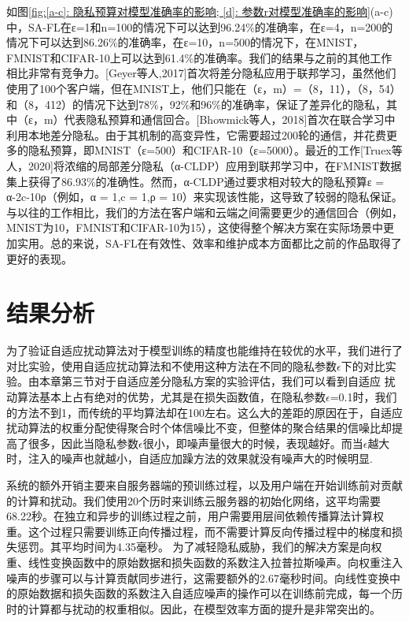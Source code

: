 如图\ref{fig:[a-c]: 隐私预算对模型准确率的影响; [d]: 参数r对模型准确率的影响}(a-c)中，SA-FL在ε=1和n=100的情况下可以达到96.24$\%$的准确率，在ε=4，n=200的情况下可以达到86.26$\%$的准确率，在ε=10，n=500的情况下，在MNIST，FMNIST和CIFAR-10上可以达到61.4$\%$的准确率。我们的结果与之前的其他工作相比非常有竞争力。[Geyer等人,2017]首次将差分隐私应用于联邦学习，虽然他们使用了100个客户端，但在MNIST上，他们只能在（ε，m）=（8，11），（8，54）和（8，412）的情况下达到78$\%$，92$\%$和96$\%$的准确率，保证了差异化的隐私，其中（ε，m）代表隐私预算和通信回合。[Bhowmick等人，2018]首次在联合学习中利用本地差分隐私。由于其机制的高变异性，它需要超过200轮的通信，并花费更多的隐私预算，即MNIST（ε=500）和CIFAR-10（ε=5000）。最近的工作[Truex等人，2020]将浓缩的局部差分隐私（α-CLDP）应用到联邦学习中，在FMNIST数据集上获得了86.93$\%$的准确性。然而，α-CLDP通过要求相对较大的隐私预算ε = α-2c-10ρ（例如，α = 1,c = 1,ρ = 10）来实现该性能，这导致了较弱的隐私保证。与以往的工作相比，我们的方法在客户端和云端之间需要更少的通信回合（例如，MNIST为10，FMNIST和CIFAR-10为15），这使得整个解决方案在实际场景中更加实用。总的来说，SA-FL在有效性、效率和维护成本方面都比之前的作品取得了更好的表现。


\section{结果分析}
为了验证自适应扰动算法对于模型训练的精度也能维持在较优的水平，我们进行了对比实验，使用自适应扰动算法和不使用这种方法在不同的隐私参数$\epsilon$下的对比实验。由本章第三节对于自适应差分隐私方案的实验评估，我们可以看到自适应
扰动算法基本上占有绝对的优势，尤其是在损失函数值，在隐私参数$\epsilon$=0.1时，我们的方法不到1，而传统的平均算法却在100左右。这么大的差距的原因在于，自适应扰动算法的权重分配使得聚合时个体信噪比不变，但整体的聚合结果的信噪比却提高了很多，因此当隐私参数$\epsilon$很小，即噪声量很大的时候，表现越好。而当$\epsilon$越大时，注入的噪声也就越小，自适应加躁方法的效果就没有噪声大的时候明显.

系统的额外开销主要来自服务器端的预训练过程，以及用户端在开始训练前对贡献的计算和扰动。我们使用20个历时来训练云服务器的初始化网络，这平均需要68.22秒。在独立和异步的训练过程之前，用户需要用层间依赖传播算法计算权重。这个过程只需要训练正向传播过程，而不需要计算反向传播过程中的梯度和损失惩罚。其平均时间为4.35毫秒。
为了减轻隐私威胁，我们的解决方案是向权重、线性变换函数中的原始数据和损失函数的系数注入拉普拉斯噪声。向权重注入噪声的步骤可以与计算贡献同步进行，这需要额外的2.67毫秒时间。向线性变换中的原始数据和损失函数的系数注入自适应噪声的操作可以在训练前完成，每一个历时的计算都与扰动的权重相似。因此，在模型效率方面的提升是非常突出的。

